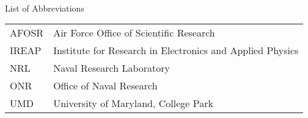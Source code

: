 

\renewcommand{\baselinestretch}{1}
\small\normalsize
\hbox{\ }

\vspace{-4em}

\begin{center}
\large{List of Abbreviations}
\end{center} 

\vspace{3pt}

\begin{supertabular}{ll}
AFOSR & Air Force Office of Scientific Research \\
IREAP & Institute for Research in Electronics and Applied Physics \\
NRL & Naval Research Laboratory \\
ONR & Office of Naval Research \\
UMD & University of Maryland, College Park \\
\end{supertabular}
